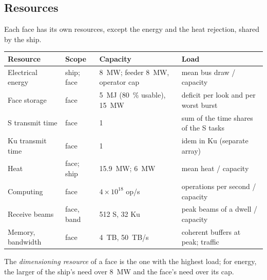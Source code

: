 \documentclass[11pt,a4paper]{article}
\begin{document}
\subsection{Resources}
Each face has its own resources, except the energy and the heat rejection, shared by the ship.
\begin{center}
{\small\begin{tabularx}{\linewidth}{@{}lllL@{}}
\toprule
Resource & Scope & Capacity & Load\\
\midrule
Electrical energy & ship; face & \SI{8}{MW}; feeder \SI{8}{MW}, operator cap & mean bus draw / capacity\\
Face storage & face & \SI{5}{MJ} (\SI{80}{\percent} usable), \SI{15}{MW} & deficit per look and per worst burst\\
S transmit time & face & 1 & sum of the time shares of the S tasks\\
Ku transmit time & face & 1 & idem in Ku (separate array)\\
Heat & face; ship & \SI{15.9}{MW}; \SI{6}{MW} & mean heat / capacity\\
Computing & face & $4\times10^{18}$ op/s & operations per second / capacity\\
Receive beams & face, band & 512 S, 32 Ku & peak beams of a dwell / capacity\\
Memory, bandwidth & face & \SI{4}{TB}, \SI{50}{TB/s} & coherent buffers at peak; traffic\\
\bottomrule
\end{tabularx}}
\end{center}
The \emph{dimensioning resource} of a face is the one with the highest load; for energy, the larger of the ship's
need over \SI{8}{MW} and the face's need over its cap.
\end{document}
